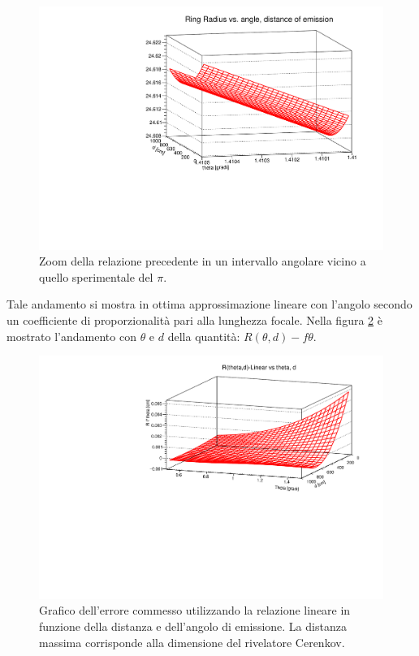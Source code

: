 \documentclass[8pt]{extarticle}
\begin{document}
\begin{figure}
\begin{center}
\includegraphics[scale=0.4]{tf2_radius_zoom}
\caption{Zoom della relazione precedente in un intervallo angolare vicino a quello sperimentale del $\pi$.}
\label{fig:tf2_radius_zoom}
\end{center}
\end{figure}

Tale andamento si mostra in ottima approssimazione lineare con l'angolo secondo un coefficiente di proporzionalità pari alla lunghezza focale. Nella figura \ref{fig:tf2_deviazione} è mostrato l'andamento con $\theta$ e $d$ della quantità: $R(\theta,d)-f\theta$. \\

\begin{figure}
\begin{center}
\includegraphics[scale=0.4]{tf2_deviazione}
\caption{Grafico dell'errore commesso utilizzando la relazione lineare in funzione della distanza e dell'angolo di emissione. La distanza massima corrisponde alla dimensione del rivelatore Cerenkov.}
\label{fig:tf2_deviazione}
\end{center}
\end{figure}
\end{document}
